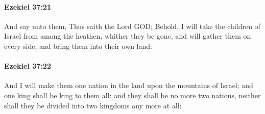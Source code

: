 		\paragraph{Ezekiel 37:21} %
			\label{EZEKIEL-37-21}

			And say unto them, Thus saith the Lord GOD; Behold, I will take the children of Israel from among the heathen, whither they be gone, and will gather them on every side, and bring them into their own land:


		\paragraph{Ezekiel 37:22} %
			\label{EZEKIEL-37-22}

			And I will make them one nation in the land upon the mountains of Israel; and one king shall be king to them all: and they shall be no more two nations, neither shall they be divided into two kingdoms any more at all:

